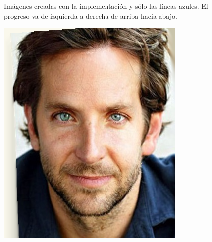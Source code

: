 \documentclass[conference]{IEEEtran}
\begin{document}
\begin{figure}[H]
\begin{multicols}{3}
\end{multicols}
\caption{Imágenes creadas con la implementación y sólo las líneas azules. El progreso va de izquierda a derecha de arriba hacia abajo.}
\end{figure}

\begin{figure}[H]
\begin{multicols}{3}
    \centering
    \includegraphics[width=1.0\linewidth]{results/faces/XL/img01.png} \par

\end{multicols}
\end{figure}
\end{document}
